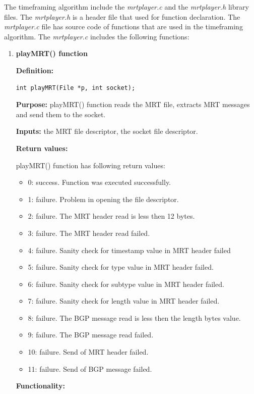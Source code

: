 The timeframing algorithm include the \emph{mrtplayer.c} and the \emph{mrtplayer.h} library files. The \emph{mrtplayer.h} is a header file that used for function declaration. The \emph{mrtplayer.c} file has source code of functions that are used in the timeframing algorithm. The \emph{mrtplayer.c} includes the  following functions: 

\begin{enumerate}


\item{\textbf{playMRT() function} }

\textbf{Definition:}  
\begin{verbatim}
int playMRT(File *p, int socket);
\end{verbatim}

\textbf{Purpose:}  playMRT() function reads the MRT file, extracts MRT messages and send them to the socket. 

\textbf{Inputs:} the MRT file descriptor, the socket file descriptor.

\textbf{Return values:}

playMRT() function has following return values: 

\begin{itemize}
\item{0: success. Function was executed successfully. }
\item{1: failure. Problem in opening the file descriptor.}
\item{2: failure. The MRT header read is less then 12 bytes.}
\item{3: failure. The MRT header read failed.}
\item{4: failure. Sanity check for timestamp value in MRT header failed}
\item{5: failure. Sanity check for type value in MRT header failed.}
\item{6: failure. Sanity check for subtype value in MRT header failed.}
\item{7: failure. Sanity check for length value in MRT header failed.}
\item{8: failure. The BGP message read is less then the length  bytes value.}
\item{9: failure. The BGP message read failed. }
\item{10: failure. Send of MRT header failed.}
\item{11: failure. Send of BGP message failed.}
\end{itemize} 

\textbf{Functionality:}


\end{enumerate}
